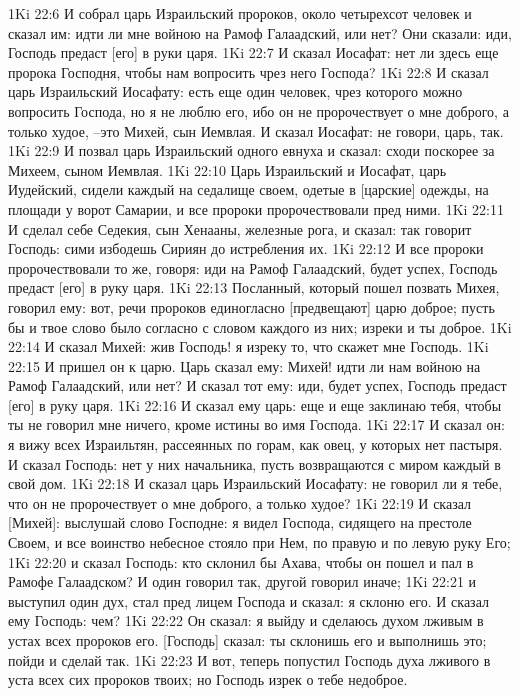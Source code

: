 1Ki 22:6  И собрал царь Израильский пророков, около четырехсот человек и сказал им: идти ли мне войною на Рамоф Галаадский, или нет? Они сказали: иди, Господь предаст [его] в руки царя.
1Ki 22:7  И сказал Иосафат: нет ли здесь еще пророка Господня, чтобы нам вопросить чрез него Господа?
1Ki 22:8  И сказал царь Израильский Иосафату: есть еще один человек, чрез которого можно вопросить Господа, но я не люблю его, ибо он не пророчествует о мне доброго, а только худое, --это Михей, сын Иемвлая. И сказал Иосафат: не говори, царь, так.
1Ki 22:9  И позвал царь Израильский одного евнуха и сказал: сходи поскорее за Михеем, сыном Иемвлая.
1Ki 22:10  Царь Израильский и Иосафат, царь Иудейский, сидели каждый на седалище своем, одетые в [царские] одежды, на площади у ворот Самарии, и все пророки пророчествовали пред ними.
1Ki 22:11  И сделал себе Седекия, сын Хенааны, железные рога, и сказал: так говорит Господь: сими избодешь Сириян до истребления их.
1Ki 22:12  И все пророки пророчествовали то же, говоря: иди на Рамоф Галаадский, будет успех, Господь предаст [его] в руку царя.
1Ki 22:13  Посланный, который пошел позвать Михея, говорил ему: вот, речи пророков единогласно [предвещают] царю доброе; пусть бы и твое слово было согласно с словом каждого из них; изреки и ты доброе.
1Ki 22:14  И сказал Михей: жив Господь! я изреку то, что скажет мне Господь.
1Ki 22:15  И пришел он к царю. Царь сказал ему: Михей! идти ли нам войною на Рамоф Галаадский, или нет? И сказал тот ему: иди, будет успех, Господь предаст [его] в руку царя.
1Ki 22:16  И сказал ему царь: еще и еще заклинаю тебя, чтобы ты не говорил мне ничего, кроме истины во имя Господа.
1Ki 22:17  И сказал он: я вижу всех Израильтян, рассеянных по горам, как овец, у которых нет пастыря. И сказал Господь: нет у них начальника, пусть возвращаются с миром каждый в свой дом.
1Ki 22:18  И сказал царь Израильский Иосафату: не говорил ли я тебе, что он не пророчествует о мне доброго, а только худое?
1Ki 22:19  И сказал [Михей]: выслушай слово Господне: я видел Господа, сидящего на престоле Своем, и все воинство небесное стояло при Нем, по правую и по левую руку Его;
1Ki 22:20  и сказал Господь: кто склонил бы Ахава, чтобы он пошел и пал в Рамофе Галаадском? И один говорил так, другой говорил иначе;
1Ki 22:21  и выступил один дух, стал пред лицем Господа и сказал: я склоню его. И сказал ему Господь: чем?
1Ki 22:22  Он сказал: я выйду и сделаюсь духом лживым в устах всех пророков его. [Господь] сказал: ты склонишь его и выполнишь это; пойди и сделай так.
1Ki 22:23  И вот, теперь попустил Господь духа лживого в уста всех сих пророков твоих; но Господь изрек о тебе недоброе.

